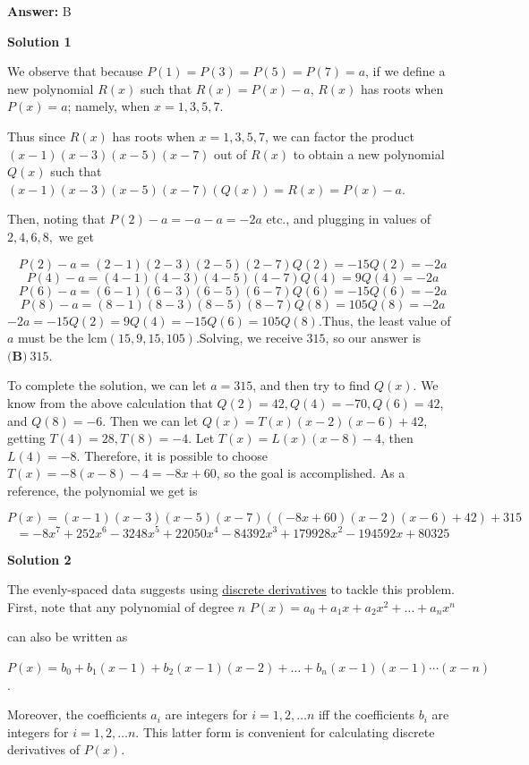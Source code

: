 \begin{enumerate}
 \textbf{Answer: }B



\textbf{Solution 1}

We observe that because $P(1) = P(3) = P(5) = P(7) = a$, if we define a new polynomial $R(x)$ such that $R(x) = P(x) - a$, $R(x)$ has roots when $P(x) = a$; namely, when $x=1,3,5,7$.

 Thus since $R(x)$ has roots when $x=1,3,5,7$, we can factor the product $(x-1)(x-3)(x-5)(x-7)$ out of $R(x)$ to obtain a new polynomial $Q(x)$ such that $(x-1)(x-3)(x-5)(x-7)(Q(x)) = R(x) = P(x) - a$.

 Then, noting that $P(2)-a=-a-a=-2a$ etc., and plugging in values of $2,4,6,8,$ we get 

 
 \[P(2)-a=(2-1)(2-3)(2-5)(2-7)Q(2) = -15Q(2) = -2a\]
 \[P(4)-a=(4-1)(4-3)(4-5)(4-7)Q(4) = 9Q(4) = -2a\]
 \[P(6)-a=(6-1)(6-3)(6-5)(6-7)Q(6) = -15Q(6) = -2a\]
 \[P(8)-a=(8-1)(8-3)(8-5)(8-7)Q(8) = 105Q(8) = -2a\]
$-2a=-15Q(2)=9Q(4)=-15Q(6)=105Q(8).$Thus, the least value of $a$ must be the $\text{lcm}(15,9,15,105)$.Solving, we receive $315$, so our answer is $\boxed{\textbf{(B)}\ 315}$.

 To complete the solution, we can let $a = 315$, and then try to find $Q(x)$. We know from the above calculation that $Q(2)=42, Q(4)=-70, Q(6)=42$, and $Q(8)=-6$. Then we can let $Q(x) = T(x)(x-2)(x-6)+42$, getting $T(4)=28, T(8)=-4$. Let $T(x)=L(x)(x-8)-4$, then $L(4)=-8$. Therefore, it is possible to choose $T(x) = -8(x-8)-4 = -8x + 60$, so the goal is accomplished. As a reference, the polynomial we get is

 
 \[P(x) = (x-1)(x-3)(x-5)(x-7)((-8x + 60)(x-2)(x-6)+42) + 315\]
 \[= -8 x^7+252 x^6-3248 x^5+22050 x^4-84392 x^3+179928 x^2-194592 x+80325\]




\textbf{Solution 2}

The evenly-spaced data suggests using \href{https://artofproblemsolving.com/wiki/index.php?title=Discrete\_derivative}{discrete derivatives} to tackle this problem.  First, note that any polynomial of degree $n$
$P(x) = a_0 + a_1 x + a_2 x^2 + \ldots + a_n x^n$

 can also be written as

 $P(x) = b_0 + b_1 (x-1) + b_2 (x-1)(x-2) + \ldots + b_n (x-1)(x-1) \cdots (x-n)$.

 Moreover, the coefficients $a_i$ are integers for $i=1, 2, \ldots n$ iff the coefficients $b_i$ are integers for $i=1, 2, \ldots n$.  This latter form is convenient for calculating discrete derivatives of $P(x)$.


\end{enumerate}
